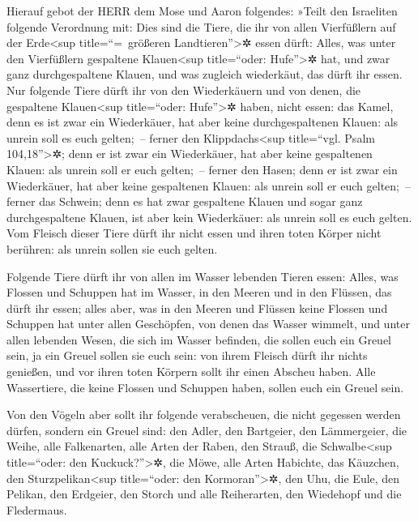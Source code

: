 Hierauf gebot der HERR dem Mose und Aaron folgendes:
»Teilt den Israeliten folgende Verordnung mit: Dies sind
die Tiere, die ihr von allen Vierfüßlern auf der Erde\textless sup
title=``=~größeren Landtieren''\textgreater✲ essen dürft:
Alles, was unter den Vierfüßlern gespaltene
Klauen\textless sup title=``oder: Hufe''\textgreater✲ hat, und zwar ganz
durchgespaltene Klauen, und was zugleich wiederkäut, das dürft ihr
essen. Nur folgende Tiere dürft ihr von den Wiederkäuern
und von denen, die gespaltene Klauen\textless sup title=``oder:
Hufe''\textgreater✲ haben, nicht essen: das Kamel, denn es ist zwar ein
Wiederkäuer, hat aber keine durchgespaltenen Klauen: als unrein soll es
euch gelten;~-- ferner den Klippdachs\textless sup
title=``vgl. Psalm 104,18''\textgreater✲; denn er ist zwar ein
Wiederkäuer, hat aber keine gespaltenen Klauen: als unrein soll er euch
gelten;~-- ferner den Hasen; denn er ist zwar ein
Wiederkäuer, hat aber keine gespaltenen Klauen: als unrein soll er euch
gelten;~-- ferner das Schwein; denn es hat zwar gespaltene
Klauen und sogar ganz durchgespaltene Klauen, ist aber kein Wiederkäuer:
als unrein soll es euch gelten. Vom Fleisch dieser Tiere
dürft ihr nicht essen und ihren toten Körper nicht berühren: als unrein
sollen sie euch gelten.

Folgende Tiere dürft ihr von allen im Wasser lebenden
Tieren essen: Alles, was Flossen und Schuppen hat im Wasser, in den
Meeren und in den Flüssen, das dürft ihr essen; alles
aber, was in den Meeren und Flüssen keine Flossen und Schuppen hat unter
allen Geschöpfen, von denen das Wasser wimmelt, und unter allen lebenden
Wesen, die sich im Wasser befinden, die sollen euch ein Greuel sein,
ja ein Greuel sollen sie euch sein: von ihrem Fleisch
dürft ihr nichts genießen, und vor ihren toten Körpern sollt ihr einen
Abscheu haben. Alle Wassertiere, die keine Flossen und
Schuppen haben, sollen euch ein Greuel sein.

Von den Vögeln aber sollt ihr folgende verabscheuen, die
nicht gegessen werden dürfen, sondern ein Greuel sind: den Adler, den
Bartgeier, den Lämmergeier, die Weihe, alle Falkenarten,
alle Arten der Raben, den Strauß, die
Schwalbe\textless sup title=``oder: den Kuckuck?''\textgreater✲, die
Möwe, alle Arten Habichte, das Käuzchen, den
Sturzpelikan\textless sup title=``oder: den Kormoran''\textgreater✲, den
Uhu, die Eule, den Pelikan, den Erdgeier,
den Storch und alle Reiherarten, den Wiedehopf und die
Fledermaus.


